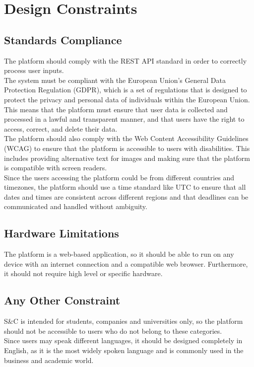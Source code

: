 \section{Design Constraints}

\subsection{Standards Compliance}
The platform should comply with the REST API standard in order to correctly process user inputs. \\
The system must be compliant with the European Union's General Data Protection Regulation (GDPR), which is a set of regulations that is designed
to protect the privacy and personal data of individuals within the European Union. This means that the platform must ensure that user data is
collected and processed in a lawful and transparent manner, and that users have the right to access, correct, and delete their data. \\
The platform should also comply with the Web Content Accessibility Guidelines (WCAG) to ensure that the platform is accessible to users with
disabilities. This includes providing alternative text for images and making sure that the platform is compatible with screen readers. \\
Since the users accessing the platform could be from different countries and timezones, the platform should use a time standard like UTC to
ensure that all dates and times are consistent across different regions and that deadlines can be communicated and handled without ambiguity.

\subsection{Hardware Limitations}
The platform is a web-based application, so it should be able to run on any device with an internet connection and a compatible web browser. 
Furthermore, it should not require high level or specific hardware.

\subsection{Any Other Constraint}
S\&C is intended for students, companies and universities only, so the platform should not be accessible to users who do not belong to these
categories. \\
Since users may speak different languages, it should be designed completely in English, as it is the most widely spoken language and is commonly 
used in the business and academic world.



